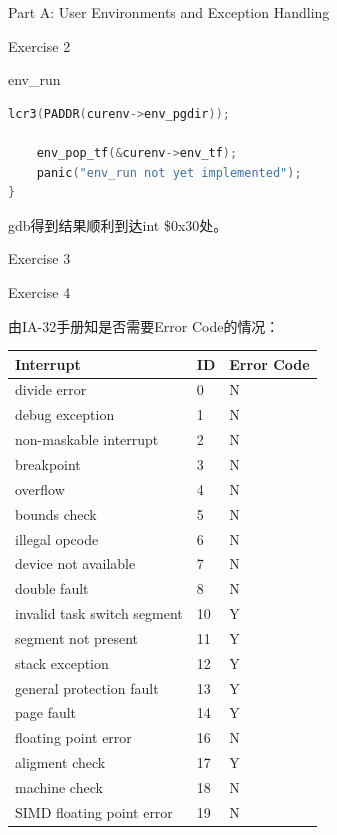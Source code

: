 \documentclass[GBK,winfonts,a4paper,10pt]{ctexart}
\begin{document}
\begin{section}{ Part A: User Environments and Exception Handling }
\begin{subsection}{ Exercise 2 }
\begin{subsubsection}{env\_run}
\begin{lstlisting}[language=C]
    lcr3(PADDR(curenv->env_pgdir));

    env_pop_tf(&curenv->env_tf);    
	panic("env_run not yet implemented");
}
\end{lstlisting}
\end{subsubsection}

\par
gdb得到结果顺利到达int \$0x30处。
\end{subsection}

\begin{subsection}{ Exercise 3 }
\end{subsection}

\begin{subsection}{ Exercise 4 }
\par
由IA-32手册知是否需要Error Code的情况：
\begin{center}
    \begin{tabular}{ | l | l | l |}
    \hline
Interrupt   &   ID   &   Error Code  \\ \hline
divide error	&	0	&	N	\\ \hline 				
debug exception &  1  & N	\\ \hline 
non-maskable interrupt	&	2	&	N	\\ \hline 
breakpoint	&	3	&	N	\\ \hline 
overflow		&	4	&	N	\\ \hline 
bounds check		&	5	&	N	\\ \hline 
illegal opcode	&	6	&	N	\\ \hline 
device not available		&	7	&	N	\\ \hline 
double fault				&	8	&	N	\\ \hline 
invalid task switch segment	&	10	&	Y	\\ \hline 
segment not present	&	11	&	Y	\\ \hline 
stack exception	&	12	&	Y	\\ \hline 
general protection fault	&	13	&	Y	\\ \hline 
page fault	&	14	&	Y	\\ \hline 
floating point error	&	16	&	N	\\ \hline 
aligment check	&	17	&	Y		\\ \hline 
machine check		&	18	&	N	\\ \hline 
SIMD floating point error		&	19	&	N	\\ \hline
    \end{tabular}
\end{center}


\end{subsection}
\end{section}
\end{document}
